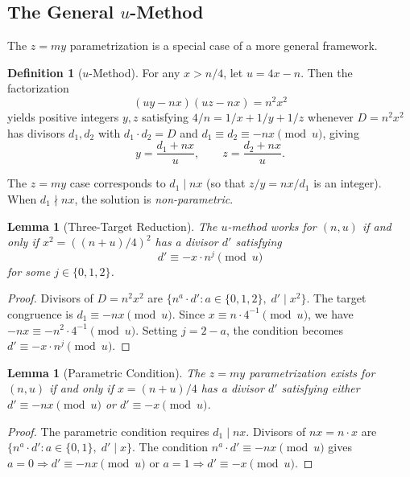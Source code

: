 \documentclass[11pt,a4paper]{article}
\theoremstyle{plain}
\newtheorem{lemma}[theorem]{Lemma}
\theoremstyle{plain}
\theoremstyle{definition}
\newtheorem{definition}[theorem]{Definition}
\numberwithin{equation}{section}
\begin{document}
\subsection{The General $u$-Method}

The $z = my$ parametrization is a special case of a more general framework.

\begin{definition}[$u$-Method]
For any $x > n/4$, let $u = 4x - n$. Then the factorization
\begin{equation}\label{eq:u-method}
(uy - nx)(uz - nx) = n^2 x^2
\end{equation}
yields positive integers $y, z$ satisfying $4/n = 1/x + 1/y + 1/z$ whenever $D = n^2 x^2$ has divisors $d_1, d_2$ with $d_1 \cdot d_2 = D$ and $d_1 \equiv d_2 \equiv -nx \pmod{u}$, giving
\begin{equation}
y = \frac{d_1 + nx}{u}, \qquad z = \frac{d_2 + nx}{u}.
\end{equation}
\end{definition}

The $z = my$ case corresponds to $d_1 \mid nx$ (so that $z/y = nx/d_1$ is an integer). When $d_1 \nmid nx$, the solution is \emph{non-parametric}.

\begin{lemma}[Three-Target Reduction]\label{lem:three-target}
The $u$-method works for $(n, u)$ if and only if $x^2 = ((n+u)/4)^2$ has a divisor $d'$ satisfying
\begin{equation}
d' \equiv -x \cdot n^j \pmod{u}
\end{equation}
for some $j \in \{0, 1, 2\}$.
\end{lemma}

\begin{proof}
Divisors of $D = n^2 x^2$ are $\{n^a \cdot d' : a \in \{0,1,2\},\; d' \mid x^2\}$. The target congruence is $d_1 \equiv -nx \pmod{u}$. Since $x \equiv n \cdot 4^{-1} \pmod{u}$, we have $-nx \equiv -n^2 \cdot 4^{-1} \pmod{u}$. Setting $j = 2 - a$, the condition becomes $d' \equiv -x \cdot n^j \pmod{u}$.
\end{proof}

\begin{lemma}[Parametric Condition]\label{lem:parametric}
The $z = my$ parametrization exists for $(n, u)$ if and only if $x = (n+u)/4$ has a divisor $d'$ satisfying either $d' \equiv -nx \pmod{u}$ or $d' \equiv -x \pmod{u}$.
\end{lemma}

\begin{proof}
The parametric condition requires $d_1 \mid nx$. Divisors of $nx = n \cdot x$ are $\{n^a \cdot d' : a \in \{0, 1\},\; d' \mid x\}$. The condition $n^a \cdot d' \equiv -nx \pmod{u}$ gives $a = 0 \Rightarrow d' \equiv -nx \pmod{u}$ or $a = 1 \Rightarrow d' \equiv -x \pmod{u}$.
\end{proof}
\end{document}
